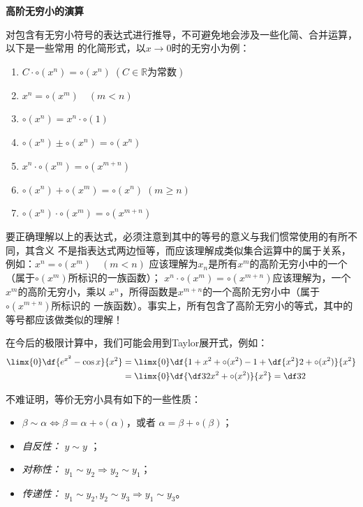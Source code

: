 \begin{shaded}
	{\bf 高阶无穷小的演算}
	
	对包含有无穷小符号的表达式进行推导，不可避免地会涉及一些化简、合并运算，以下是一些常用
	的化简形式，以$x\to 0$时的无穷小为例：
	\begin{tcolorbox}
		\begin{enumerate}[(1)]
	  	  \item $C\cdot\circ(x^n)=\circ(x^n)\;(C\in\mathbb{R}\mbox{为常数})$
		  \item $x^n=\circ(x^m)\quad (m<n)$ 
		  \item $\circ(x^n)=x^n\cdot\circ(1)$
		  \item $\circ(x^n)\pm\circ(x^n)=\circ(x^n)$
		  \item $x^n\cdot\circ(x^m)=\circ(x^{m+n})$ 
		  \item $\circ(x^n)+\circ(x^m)=\circ(x^n)\;(m\geq n)$  
		  \item $\circ(x^n)\cdot\circ(x^m)=\circ(x^{m+n})$
		\end{enumerate}
	\end{tcolorbox}
	要正确理解以上的表达式，必须注意到其中的等号的意义与我们惯常使用的有所不同，其含义
	不是指表达式两边恒等，而应该理解成类似集合运算中的属于关系，例如：$x^n=\circ(x^m)\quad (m<n)$ 
	应该理解为$x_n$是所有$x^m$的高阶无穷小中的一个（属于$\circ(x^m)$所标识的一族函数）；
	$x^n\cdot\circ(x^m)=\circ(x^{m+n})$应该理解为，一个$x^m$的高阶无穷小，乘以
	$x^n$，所得函数是$x^{m+n}$的一个高阶无穷小中（属于$\circ(x^{m+n})$所标识的
	一族函数）。事实上，所有包含了高阶无穷小的等式，其中的等号都应该做类似的理解！
	
	在今后的极限计算中，我们可能会用到Taylor展开式，例如：
	\begin{align}
		\limx{0}\df{e^{x^2}-\cos x}{x^2}&=\limx{0}
		\df{1+x^2+\circ(x^2)-1+\df{x^2}2+\circ(x^2)}{x^2}\notag\\
		&=\limx{0}\df{\df32x^2+\circ(x^2)}{x^2}=\df32\notag
	\end{align}
\end{shaded}


不难证明，等价无穷小具有如下的一些性质：
\begin{itemize}
  \setlength{\itemindent}{1cm}
  \item $\beta\sim\alpha\Leftrightarrow\beta=\alpha+\circ(\alpha)$，或者
	$\alpha=\beta+\circ(\beta)$；
  \item {\it 自反性：} $y\sim y$ ；
  \item {\it 对称性：} $y_1\sim y_2\Rightarrow y_2\sim y_1$； 
  \item {\it 传递性：} $y_1\sim y_2,y_2\sim y_3\Rightarrow y_1\sim y_3$。 
\end{itemize}

